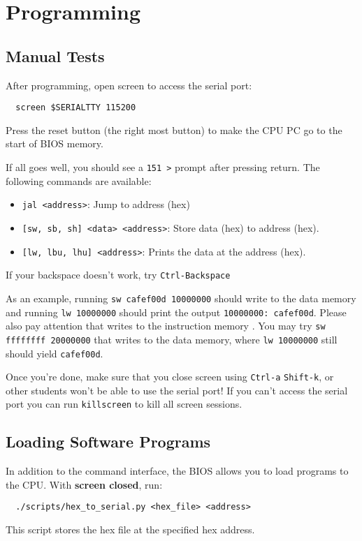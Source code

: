 \section{Programming} \label{sec:programming}
\subsection{Manual Tests}
After programming, open screen to access the serial port:
\begin{verbatim}
  screen $SERIALTTY 115200
\end{verbatim}
Press the reset button (the right most button) to make the CPU PC go to the start of BIOS memory.

If all goes well, you should see a \verb|151 >| prompt after pressing return.
The following commands are available:
\begin{itemize}
\item \verb|jal <address>|: Jump to address (hex)
\item \verb|[sw, sb, sh] <data> <address>|: Store data (hex) to address (hex).
\item \verb|[lw, lbu, lhu] <address>|: Prints the data at the address (hex).
\end{itemize}
If your backspace doesn't work, try \verb|Ctrl-Backspace|

As an example, running \verb|sw cafef00d 10000000| should write to the data memory
and running \verb|lw 10000000| should print the output \verb|10000000: cafef00d|.
Please also pay attention that writes to the instruction memory .
You may try \verb|sw ffffffff 20000000| that writes to the data memory,
where \verb|lw 10000000| still should yield \verb|cafef00d|.

Once you're done, make sure that you close screen using \verb|Ctrl-a| \verb|Shift-k|,
or other students won't be able to use the serial port!
If you can't access the serial port you can run \verb|killscreen| to kill all screen sessions.

\subsection{Loading Software Programs}
In addition to the command interface,
the BIOS allows you to load programs to the CPU.
With {\bf screen closed}, run:
\begin{verbatim}
  ./scripts/hex_to_serial.py <hex_file> <address>
\end{verbatim}
This script stores the hex file at the specified hex address.

